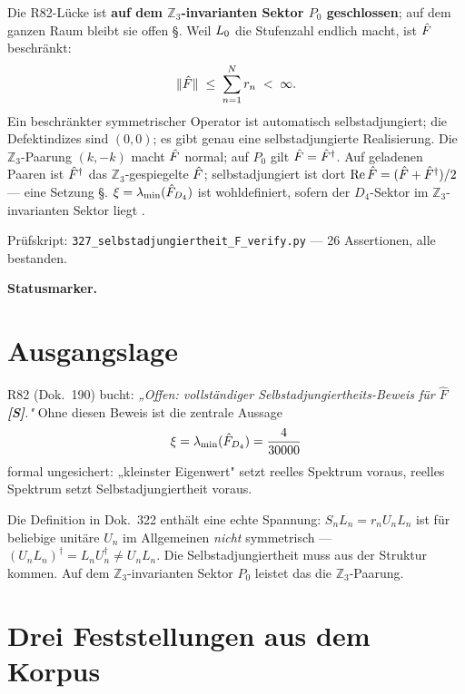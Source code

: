 \begin{tcolorbox}[ffgftbox, title={Hauptresultat \B\ auf $P_0$, \S\ auf ganz $\Hcal$}]
  Die R82-Lücke ist \textbf{auf dem $\mathbb{Z}_3$-invarianten Sektor $P_0$ geschlossen};
  auf dem ganzen Raum bleibt sie offen \S.
  Weil $L_0$ die Stufenzahl endlich macht, ist $\hat{F}$ beschränkt:
  \[
    \|\hat{F}\| \;\le\; \sum_{n=1}^{N} r_n \;<\; \infty.
  \]
  Ein beschränkter symmetrischer Operator ist automatisch selbstadjungiert;
  die Defektindizes sind $(0,0)$; es gibt genau eine selbstadjungierte
  Realisierung.
  Die $\mathbb{Z}_3$-Paarung $(k,-k)$ macht $\hat{F}$ normal; auf $P_0$
  gilt $\hat{F} = \hat{F}^\dagger$. Auf geladenen Paaren ist $\hat{F}^\dagger$
  das $\mathbb{Z}_3$-gespiegelte $\hat{F}$; selbstadjungiert ist dort
  $\mathrm{Re}\,\hat{F} = (\hat{F}+\hat{F}^\dagger)/2$ — eine Setzung \S.
  $\xi = \lambda_{\min}(\hat{F}_{D_4})$ ist wohldefiniert, sofern der
  $D_4$-Sektor im $\mathbb{Z}_3$-invarianten Sektor liegt \B.
\end{tcolorbox}

Prüfskript: \texttt{327\_selbstadjungiertheit\_F\_verify.py} —
26 Assertionen, alle bestanden.

\medskip\noindent\textbf{Statusmarker.}


\section{Ausgangslage}

R82 (Dok.~190) bucht: \emph{„Offen: vollständiger Selbstadjungiertheits-Beweis
für $\hat{F}$ \textbf{[S]}."} Ohne diesen Beweis ist die zentrale Aussage
\[
  \xi = \lambda_{\min}(\hat{F}_{D_4}) = \frac{4}{30000}
\]
formal ungesichert: „kleinster Eigenwert" setzt reelles Spektrum voraus,
reelles Spektrum setzt Selbstadjungiertheit voraus.

Die Definition in Dok.~322 enthält eine echte Spannung:
$S_nL_n = r_nU_nL_n$ ist für beliebige unitäre $U_n$ im Allgemeinen
\emph{nicht} symmetrisch — $(U_nL_n)^\dagger = L_nU_n^\dagger \neq U_nL_n$.
Die Selbstadjungiertheit muss aus der Struktur kommen.
Auf dem $\mathbb{Z}_3$-invarianten Sektor $P_0$ leistet das die $\mathbb{Z}_3$-Paarung.

\section{Drei Feststellungen aus dem Korpus}


